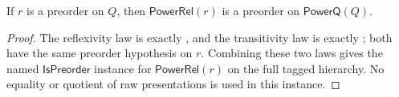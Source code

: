 \begin{lemma}
If $r$ is a preorder on $Q$, then $\mathsf{PowerRel}(r)$ is a preorder on
$\mathsf{PowerQ}(Q)$.
\end{lemma}
\begin{proof}
The reflexivity law is exactly , and the transitivity
law is exactly ; both have the same preorder
hypothesis on $r$.  Combining these two laws gives the named
$\mathsf{IsPreorder}$ instance for $\mathsf{PowerRel}(r)$ on the full tagged
hierarchy.  No equality or quotient of raw presentations is used in this
instance.
\end{proof}
